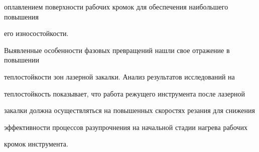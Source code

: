 оплавлением поверхности рабочих кромок для обеспечения наибольшего повышения

его износостойкости.



Выявленные особенности фазовых превращений нашли свое отражение в повышении

теплостойкости зон лазерной закалки. Анализ результатов исследований на

теплостойкость показывает, что работа режущего инструмента после лазерной

закалки должна осуществляться на повышенных скоростях резания для снижения

эффективности процессов разупрочнения на начальной стадии нагрева рабочих

кромок инструмента.



